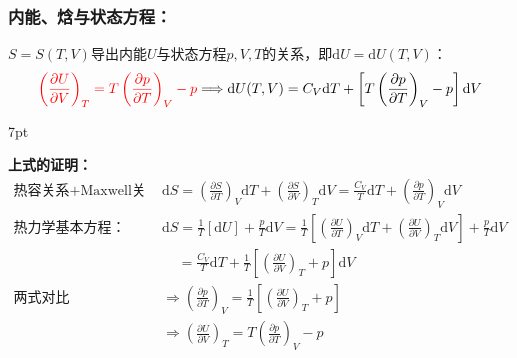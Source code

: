 \documentclass[zihao=-4,UTF8]{report}
\newenvironment{graybox}{%
\def\FrameCommand{%
\hspace{1pt}%
{\color{gray}\small \vrule width 2pt}%
{\color{graybox_color}\vrule width 4pt}%
\colorbox{graybox_color}%
}%
\MakeFramed{\advance\hsize-\width\FrameRestore}%
\noindent\hspace{-4.55pt}%
\begin{adjustwidth}{}{7pt}%
\vspace{2pt}\vspace{2pt}%
}
{%
\vspace{2pt}\end{adjustwidth}\endMakeFramed%
}
\begin{document}
\subsubsection{内能、焓与状态方程：}
\noindent{} $S = S(T,V)$导出内能$U$与状态方程$p,V,T$的关系，即$\mathrm{d}U = \mathrm{d}U(T,V)$：
\begin{gather}{\color{red}
    \left(\frac{\partial U }{\partial V }\right)_{T} = T \left(\frac{\partial p }{\partial T }\right)_{V} -p}
    \Longrightarrow 
    \mathrm{d}U(T,V) = C_V\mathrm{d}T + \left[ T \left(\frac{\partial p }{\partial T }\right)_{V} -p\right]\mathrm{d}V 
\end{gather}
\begin{graybox}
\textbf{上式的证明：}
\begin{align*}
    \text{热容关系+Maxwell关系：}&\mathrm{d}S = \left(\frac{\partial S }{\partial T }\right)_{V}\mathrm{d}T + \left(\frac{\partial S }{\partial V }\right)_{T}\mathrm{d}V=\frac{C_V}{T}\mathrm{d}T + \left(\frac{\partial p }{\partial T }\right)_{V}\mathrm{d}V\\ \label{ eq:S-T-V}
    \text{热力学基本方程：}&\mathrm{d}S =\frac{1}{T}\left[\mathrm{d}U\right] + \frac{p}{T}\mathrm{d}V = \frac{1}{T}\left[ \left(\frac{\partial U }{\partial T  }\right)_{V}\mathrm{d}T + \left(\frac{\partial U }{\partial V }\right)_{T}\mathrm{d}V \right] + \frac{p}{T}\mathrm{d}V \\ 
    &\ \ \ \ \ = \frac{C_V}{T}\mathrm{d}T + \frac{1}{T} \left[\left(\frac{\partial U }{\partial V }\right)_{T} + p\right]\mathrm{d}V\\ 
    \text{两式对比}\ &\Longrightarrow \left(\frac{\partial p }{\partial T }\right)_{V} = \frac{1}{T} \left[\left(\frac{\partial U }{\partial V }\right)_{T} + p\right] \\ 
    &\Longrightarrow \left(\frac{\partial U }{\partial V }\right)_{T} = T \left(\frac{\partial p }{\partial T }\right)_{V} -p
\end{align*}
\end{graybox}
\end{document}
